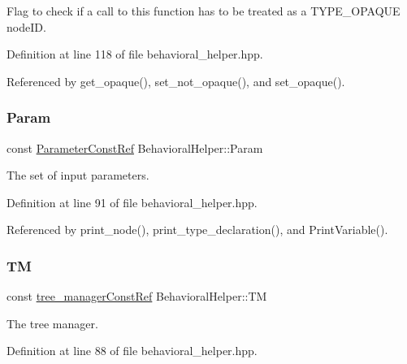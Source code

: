 Flag to check if a call to this function has to be treated as a T\+Y\+P\+E\+\_\+\+O\+P\+A\+Q\+UE node\+ID. 



Definition at line 118 of file behavioral\+\_\+helper.\+hpp.



Referenced by get\+\_\+opaque(), set\+\_\+not\+\_\+opaque(), and set\+\_\+opaque().

\mbox{\label{classBehavioralHelper_af202517b539f4631f4c35c2329692ea2}} 
\subsubsection{\texorpdfstring{Param}{Param}}
{\footnotesize\ttfamily const \hyperlink{Parameter_8hpp_a37841774a6fcb479b597fdf8955eb4ea}{Parameter\+Const\+Ref} Behavioral\+Helper\+::\+Param\hspace{0.3cm}{\ttfamily [protected]}}



The set of input parameters. 



Definition at line 91 of file behavioral\+\_\+helper.\+hpp.



Referenced by print\+\_\+node(), print\+\_\+type\+\_\+declaration(), and Print\+Variable().

\mbox{\label{classBehavioralHelper_aea1d8a15b0b7ca8e52b16d47c261be74}} 
\subsubsection{\texorpdfstring{TM}{TM}}
{\footnotesize\ttfamily const \hyperlink{tree__manager_8hpp_a792e3f1f892d7d997a8d8a4a12e39346}{tree\+\_\+manager\+Const\+Ref} Behavioral\+Helper\+::\+TM\hspace{0.3cm}{\ttfamily [protected]}}



The tree manager. 



Definition at line 88 of file behavioral\+\_\+helper.\+hpp.



